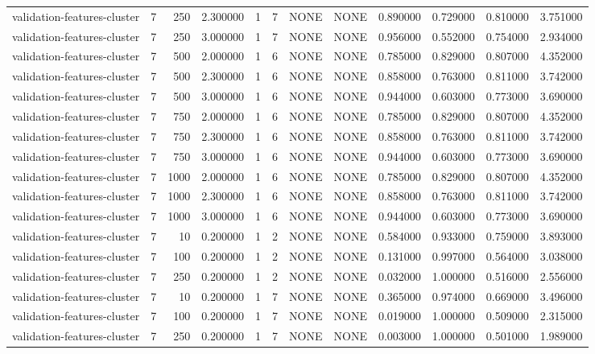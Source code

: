 \begin{tabular}{lrrrllllrrrr}
validation-features-cluster & 7 & 250 & 2.300000 & 1 & 7 & NONE & NONE & 0.890000 & 0.729000 & 0.810000 & 3.751000 \\
validation-features-cluster & 7 & 250 & 3.000000 & 1 & 7 & NONE & NONE & 0.956000 & 0.552000 & 0.754000 & 2.934000 \\
validation-features-cluster & 7 & 500 & 2.000000 & 1 & 6 & NONE & NONE & 0.785000 & 0.829000 & 0.807000 & 4.352000 \\
validation-features-cluster & 7 & 500 & 2.300000 & 1 & 6 & NONE & NONE & 0.858000 & 0.763000 & 0.811000 & 3.742000 \\
validation-features-cluster & 7 & 500 & 3.000000 & 1 & 6 & NONE & NONE & 0.944000 & 0.603000 & 0.773000 & 3.690000 \\
validation-features-cluster & 7 & 750 & 2.000000 & 1 & 6 & NONE & NONE & 0.785000 & 0.829000 & 0.807000 & 4.352000 \\
validation-features-cluster & 7 & 750 & 2.300000 & 1 & 6 & NONE & NONE & 0.858000 & 0.763000 & 0.811000 & 3.742000 \\
validation-features-cluster & 7 & 750 & 3.000000 & 1 & 6 & NONE & NONE & 0.944000 & 0.603000 & 0.773000 & 3.690000 \\
validation-features-cluster & 7 & 1000 & 2.000000 & 1 & 6 & NONE & NONE & 0.785000 & 0.829000 & 0.807000 & 4.352000 \\
validation-features-cluster & 7 & 1000 & 2.300000 & 1 & 6 & NONE & NONE & 0.858000 & 0.763000 & 0.811000 & 3.742000 \\
validation-features-cluster & 7 & 1000 & 3.000000 & 1 & 6 & NONE & NONE & 0.944000 & 0.603000 & 0.773000 & 3.690000 \\
validation-features-cluster & 7 & 10 & 0.200000 & 1 & 2 & NONE & NONE & 0.584000 & 0.933000 & 0.759000 & 3.893000 \\
validation-features-cluster & 7 & 100 & 0.200000 & 1 & 2 & NONE & NONE & 0.131000 & 0.997000 & 0.564000 & 3.038000 \\
validation-features-cluster & 7 & 250 & 0.200000 & 1 & 2 & NONE & NONE & 0.032000 & 1.000000 & 0.516000 & 2.556000 \\
validation-features-cluster & 7 & 10 & 0.200000 & 1 & 7 & NONE & NONE & 0.365000 & 0.974000 & 0.669000 & 3.496000 \\
validation-features-cluster & 7 & 100 & 0.200000 & 1 & 7 & NONE & NONE & 0.019000 & 1.000000 & 0.509000 & 2.315000 \\
validation-features-cluster & 7 & 250 & 0.200000 & 1 & 7 & NONE & NONE & 0.003000 & 1.000000 & 0.501000 & 1.989000 \\

\end{tabular}
